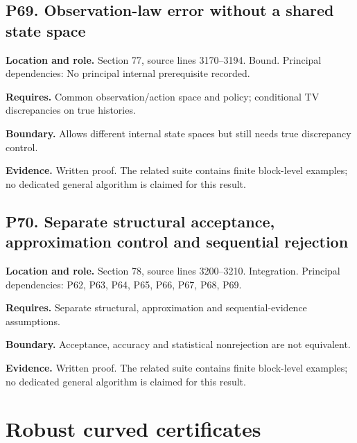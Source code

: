 \documentclass[11pt,letterpaper]{article}
\begin{document}
\par\noindent\begin{minipage}{\textwidth}
\subsection{P69. Observation-law error without a shared state
space}\label{p69.-observation-law-error-without-a-shared-state-space}

\textbf{Location and role.} Section 77, source lines 3170--3194. Bound.
Principal dependencies: No principal internal prerequisite recorded.

\textbf{Requires.} Common observation/action space and policy;
conditional TV discrepancies on true histories.

\textbf{Boundary.} Allows different internal state spaces but still
needs true discrepancy control.

\textbf{Evidence.} Written proof. The related suite contains finite
block-level examples; no dedicated general algorithm is claimed for this
result.
\end{minipage}\par\medskip

\par\noindent\begin{minipage}{\textwidth}
\subsection{P70. Separate structural acceptance, approximation control
and sequential
rejection}\label{p70.-separate-structural-acceptance-approximation-control-and-sequential-rejection}

\textbf{Location and role.} Section 78, source lines 3200--3210.
Integration. Principal dependencies: P62, P63, P64, P65, P66, P67, P68,
P69.

\textbf{Requires.} Separate structural, approximation and
sequential-evidence assumptions.

\textbf{Boundary.} Acceptance, accuracy and statistical nonrejection are
not equivalent.

\textbf{Evidence.} Written proof. The related suite contains finite
block-level examples; no dedicated general algorithm is claimed for this
result.
\end{minipage}\par\medskip

\newpage

\section{Robust curved certificates}\label{robust-curved-certificates}
\end{document}
